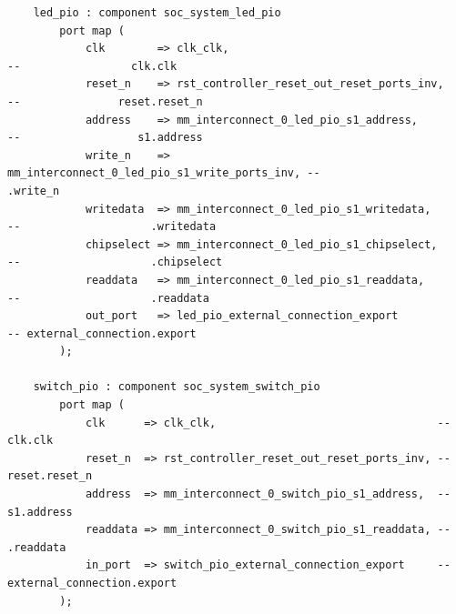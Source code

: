 \documentclass[conference]{IEEEtran}
\begin{document}
\begin{lstlisting}
	led_pio : component soc_system_led_pio
		port map (
			clk        => clk_clk,                                      --                 clk.clk
			reset_n    => rst_controller_reset_out_reset_ports_inv,     --               reset.reset_n
			address    => mm_interconnect_0_led_pio_s1_address,         --                  s1.address
			write_n    => mm_interconnect_0_led_pio_s1_write_ports_inv, --                    .write_n
			writedata  => mm_interconnect_0_led_pio_s1_writedata,       --                    .writedata
			chipselect => mm_interconnect_0_led_pio_s1_chipselect,      --                    .chipselect
			readdata   => mm_interconnect_0_led_pio_s1_readdata,        --                    .readdata
			out_port   => led_pio_external_connection_export            -- external_connection.export
		);

	switch_pio : component soc_system_switch_pio
		port map (
			clk      => clk_clk,                                  --                 clk.clk
			reset_n  => rst_controller_reset_out_reset_ports_inv, --               reset.reset_n
			address  => mm_interconnect_0_switch_pio_s1_address,  --                  s1.address
			readdata => mm_interconnect_0_switch_pio_s1_readdata, --                    .readdata
			in_port  => switch_pio_external_connection_export     -- external_connection.export
		);


\end{lstlisting}
\end{document}

